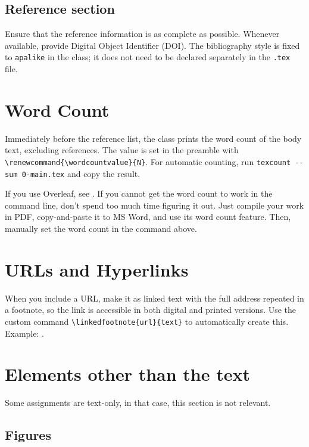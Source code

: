 \documentclass{writtenassignmentchat}
\renewcommand{\wordcountvalue}{000}
\begin{document}
\subsection{Reference section}
Ensure that the reference information is as complete as possible. 
Whenever available, provide Digital Object Identifier (DOI).
The bibliography style is fixed to \texttt{apalike} in the class; it does not need to be
declared separately in the \texttt{.tex} file.



\section{Word Count}
\label{sec:wordcount}

Immediately before the reference list, the class prints the word count of the body text, excluding references. The value is set in the preamble with \verb|\renewcommand{\wordcountvalue}{N}|. 
For automatic counting, run \texttt{texcount -{}-sum 0-main.tex} and copy the result.

If you use Overleaf, see . If you cannot get the word count to work in the command line, don't spend too much time figuring it out. Just compile your work in PDF, copy-and-paste it to MS Word, and use its word count feature. Then, manually set the word count in the command above.

\section{URLs and Hyperlinks}

When you include a URL, make it as linked text with the full address
repeated in a footnote, so the link is accessible in both digital and printed
versions.
Use the custom command \verb|\linkedfootnote{url}{text}| to automatically create this.
Example: .


\section{Elements other than the text}
Some assignments are text-only, in that case, this section is not relevant.

\subsection{Figures}
\end{document}
